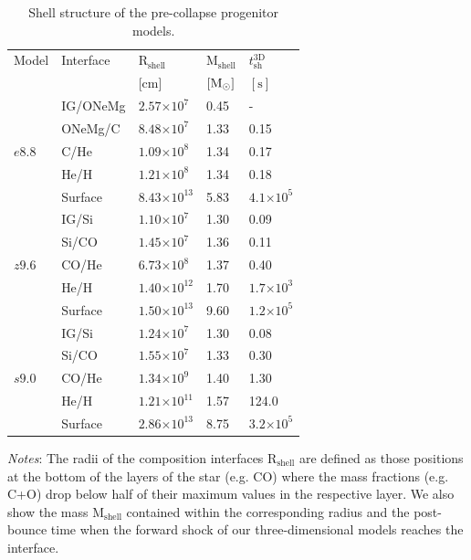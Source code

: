 \documentclass[fleqn,usenatbib]{mnras}
\newcommand{\solm}{\ensuremath{\rm{M_{\odot}}}\xspace}
\newcommand{\s}{\ensuremath{\text{s}}}
\newcommand{\GEO}[1]{{\color{red}#1}}
\begin{document}
\begin{table}
   \caption{Shell structure of the pre-collapse progenitor models.}
   \label{tab:progenitors}
   \begin{tabular}{l l l l l} 
   \hline
     Model      &Interface & $\mathrm{R_{shell}\,}$ & $\mathrm{M_{shell}}$ & $t_{\mathrm{sh}}^{\mathrm{3D}}$\\ [0.5ex] 
                &          & [cm] & $[\solm]$ & $[\s]$\\ [0.5ex] 
   \hline
   \multirow{5}{*}{$e8.8$} & IG/ONeMg & $2.57\mathord{\times} 10^{7}$  & 0.45 & - \\ 
                           & ONeMg/C    & $8.48\mathord{\times} 10^{7}$  & 1.33 & 0.15 \\
                           & C/He       & $1.09\mathord{\times} 10^{8}$  & 1.34 & 0.17 \\
                           & He/H       & $1.21\mathord{\times} 10^{8}$  & 1.34 & 0.18\\
                           & Surface    & $8.43\mathord{\times} 10^{13}$ & 5.83 & $4.1\mathord{\times}10^5$\\
   \hline
   \multirow{5}{*}{$z9.6$} & IG/Si    & $1.10\mathord{\times} 10^{7}$  & 1.30 & 0.09 \\ 
                           & Si/CO       & $1.45\mathord{\times} 10^{7}$  & 1.36 & 0.11\\ 
                           & CO/He      & $6.73\mathord{\times} 10^{8}$  & 1.37 & 0.40\\
                           & He/H       & $1.40\mathord{\times} 10^{12}$ & 1.70 & $1.7\mathord{\times}10^{3}$\\
                           & Surface    & $1.50\mathord{\times} 10^{13}$ & 9.60 & $1.2\mathord{\times}10^5$  \\
   \hline
   \multirow{5}{*}{$s9.0$} & IG/Si    & $1.24\mathord{\times} 10^{7}$   & 1.30 & 0.08 \\ 
                           & Si/CO       & $1.55\mathord{\times} 10^{7}$   & 1.33 & 0.30 \\ 
                           & CO/He      & $1.34\mathord{\times} 10^{9}$  & 1.40 & 1.30\\
                           & He/H       & $1.21\mathord{\times} 10^{11}$  & 1.57 & 124.0 \\
                           & Surface    & $2.86\mathord{\times} 10^{13}$  & 8.75 & $3.2\mathord{\times} 10^5$ \\
  \hline
   \end{tabular}

\flushleft
\textit{Notes}: \GEO{The radii of the composition interfaces $\mathrm{R}_{\mathrm{shell}}$ are defined as those positions at the bottom of the layers of the star (e.g. CO) where the mass fractions (e.g. C+O) drop below half of their maximum values in the respective layer. We also show the mass $\mathrm{M}_{\mathrm{shell}}$ contained within the corresponding radius and the post-bounce time when the forward shock of our three-dimensional models reaches the interface.}
\end{table}
\end{document}
